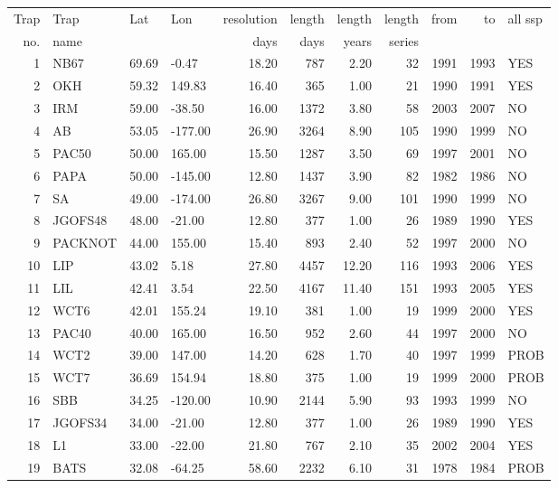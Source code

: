 \begin{tabular}{rlllrrrrrrl}
  \hline
Trap & Trap & Lat & Lon & resolution & length & length & length & from & to & all ssp \\ 
no.  & name &  &  & days & days & years & series &  &   &  \\ 
  \hline
  1 & NB67 & 69.69 & -0.47 & 18.20 & 787 & 2.20 &  32 & 1991 & 1993 & YES \\ 
    2 & OKH & 59.32 & 149.83 & 16.40 & 365 & 1.00 &  21 & 1990 & 1991 & YES \\ 
    3 & IRM & 59.00 & -38.50 & 16.00 & 1372 & 3.80 &  58 & 2003 & 2007 & NO \\ 
    4 & AB & 53.05 & -177.00 & 26.90 & 3264 & 8.90 & 105 & 1990 & 1999 & NO \\ 
    5 & PAC50 & 50.00 & 165.00 & 15.50 & 1287 & 3.50 &  69 & 1997 & 2001 & NO \\ 
    6 & PAPA & 50.00 & -145.00 & 12.80 & 1437 & 3.90 &  82 & 1982 & 1986 & NO \\ 
    7 & SA & 49.00 & -174.00 & 26.80 & 3267 & 9.00 & 101 & 1990 & 1999 & NO \\ 
    8 & JGOFS48 & 48.00 & -21.00 & 12.80 & 377 & 1.00 &  26 & 1989 & 1990 & YES \\ 
    9 & PACKNOT & 44.00 & 155.00 & 15.40 & 893 & 2.40 &  52 & 1997 & 2000 & NO \\ 
   10 & LIP & 43.02 & 5.18 & 27.80 & 4457 & 12.20 & 116 & 1993 & 2006 & YES \\ 
   11 & LIL & 42.41 & 3.54 & 22.50 & 4167 & 11.40 & 151 & 1993 & 2005 & YES \\ 
   12 & WCT6 & 42.01 & 155.24 & 19.10 & 381 & 1.00 &  19 & 1999 & 2000 & YES \\ 
   13 & PAC40 & 40.00 & 165.00 & 16.50 & 952 & 2.60 &  44 & 1997 & 2000 & NO \\ 
   14 & WCT2 & 39.00 & 147.00 & 14.20 & 628 & 1.70 &  40 & 1997 & 1999 & PROB \\ 
   15 & WCT7 & 36.69 & 154.94 & 18.80 & 375 & 1.00 &  19 & 1999 & 2000 & PROB \\ 
   16 & SBB & 34.25 & -120.00 & 10.90 & 2144 & 5.90 &  93 & 1993 & 1999 & NO \\ 
   17 & JGOFS34 & 34.00 & -21.00 & 12.80 & 377 & 1.00 &  26 & 1989 & 1990 & YES \\ 
   18 & L1 & 33.00 & -22.00 & 21.80 & 767 & 2.10 &  35 & 2002 & 2004 & YES \\ 
   19 & BATS & 32.08 & -64.25 & 58.60 & 2232 & 6.10 &  31 & 1978 & 1984 & PROB \\ 

\end{tabular}
